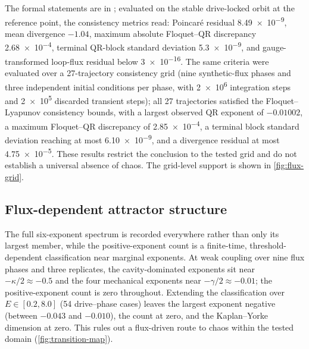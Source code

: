 \documentclass[preprint,numbers,a4paper]{elsarticle}
\begin{document}
The formal statements are in ; evaluated on the stable drive-locked orbit at the reference point, the consistency metrics read: Poincar\'e residual \num{8.49e-9}, mean divergence $-\num{1.04}$, maximum absolute Floquet--QR discrepancy \num{2.68e-4}, terminal QR-block standard deviation \num{5.3e-9}, and gauge-transformed loop-flux residual below \num{3e-16}. The same criteria were evaluated over a \num{27}-trajectory consistency grid (nine synthetic-flux phases and three independent initial conditions per phase, with \num{2e6} integration steps and \num{2e5} discarded transient steps); all 27 trajectories satisfied the Floquet--Lyapunov consistency bounds, with a largest observed QR exponent of $-\num{0.01002}$, a maximum Floquet--QR discrepancy of \num{2.85e-4}, a terminal block standard deviation reaching at most \num{6.10e-9}, and a divergence residual at most \num{4.75e-5}. These results restrict the conclusion to the tested grid and do not establish a universal absence of chaos. The grid-level support is shown in \cref{fig:flux-grid}.

\subsection{Flux-dependent attractor structure}

The full six-exponent spectrum is recorded everywhere rather than only its largest member, while the positive-exponent count is a finite-time, threshold-dependent classification near marginal exponents. At weak coupling over nine flux phases and three replicates, the cavity-dominated exponents sit near $-\kappa/2\approx\num{-0.5}$ and the four mechanical exponents near $-\gamma/2\approx\num{-0.01}$; the positive-exponent count is zero throughout. Extending the classification over $E\in[\num{0.2},\num{8.0}]$ (\num{54} drive--phase cases) leaves the largest exponent negative (between $\num{-0.043}$ and $\num{-0.010}$), the count at zero, and the Kaplan--Yorke dimension at zero. This rules out a flux-driven route to chaos within the tested domain (\cref{fig:transition-map}).
\end{document}

